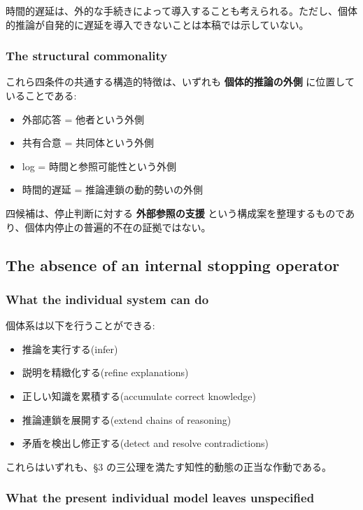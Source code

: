 時間的遅延は、外的な手続きによって導入することも考えられる。ただし、個体的推論が自発的に遅延を導入できないことは本稿では示していない。

\subsubsection{The structural commonality}


これら四条件の共通する構造的特徴は、いずれも \textbf{個体的推論の外側} に位置していることである:

\begin{itemize}
\item 外部応答 = 他者という外側
\item 共有合意 = 共同体という外側
\item log = 時間と参照可能性という外側
\item 時間的遅延 = 推論連鎖の動的勢いの外側
\end{itemize}

四候補は、停止判断に対する \textbf{外部参照の支援} という構成案を整理するものであり、個体内停止の普遍的不在の証拠ではない。

\subsection{The absence of an internal stopping operator}


\subsubsection{What the individual system can do}


個体系は以下を行うことができる:

\begin{itemize}
\item 推論を実行する(infer)
\item 説明を精緻化する(refine explanations)
\item 正しい知識を累積する(accumulate correct knowledge)
\item 推論連鎖を展開する(extend chains of reasoning)
\item 矛盾を検出し修正する(detect and resolve contradictions)
\end{itemize}

これらはいずれも、\S{}3 の三公理を満たす知性的動態の正当な作動である。

\subsubsection{What the present individual model leaves unspecified}


